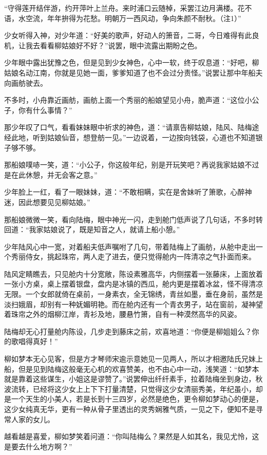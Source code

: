 “守得莲开结伴游，约开萍叶上兰舟。来时浦口云随棹，采罢江边月满楼。花不语，水空流，年年拚得为花愁。明朝万一西风动，争向朱颜不耐秋。（注1）”

少女听得入神，对少年道：“好美的歌声，好动人的箫音，二哥，今日难得有此良机，让我去看看柳姑娘好不好？”说罢，眼中流露出期盼之色。

少年眼中露出犹豫之色，但是见到少女神色，心中一软，终于叹息道：“好吧，柳姑娘名动江南，你就是见她一面，爹爹知道了也不会过分责怪。”说罢让那中年船夫向画舫驶去。

不多时，小舟靠近画舫，画舫上面一个秀丽的船娘望见小舟，脆声道：“这位小公子，你有什么事情？”

那少年叹了口气，看看妹妹眼中祈求的神色，道：“请禀告柳姑娘，陆风、陆梅途经此地，听到姑娘仙音，想登舫一见。”一边说着，一边按向钱袋，心道也不知道银子够不够。

那船娘噗哧一笑，道：“小公子，你这般年纪，别是开玩笑吧？再说我家姑娘不过是在此休憩，并无会客之意。”

少年脸上一红，看了一眼妹妹，道：“不敢相瞒，实在是舍妹听了箫歌，心醉神迷，因此想要见见柳姑娘。”

那船娘微微一笑，看向陆梅，眼中神光一闪，走到舱门低声说了几句话，不多时转回道：“我家姑娘说了，既是知音之人，就请上船小憩。”

少年陆风心中一宽，对着船夫低声嘱咐了几句，带着陆梅上了画舫，从舱中走出一个秀丽侍女，挑起珠帘，两人走了进去，便只觉得舱内一阵清凉之气扑面而来。

陆风定睛瞧去，只见舱内十分宽敞，陈设素雅高华，内侧摆着一张藤床，上面放着一张小方桌，桌上摆着银盘，盘内是冰镇的西瓜，舱内更是摆着冰盆，怪不得清凉无限。一个女郎就倚在桌前，一身素衣，全无锦绣，青丝如墨，垂在身前，虽然是淡扫娥眉，却别有一种妩媚明艳。而在舱内还有一个青衣男子，站在窗前，凝神望着珠帘之外的烟柳江岸，青衫及地，腰悬竹箫，自有一种漠然高华的风姿。

陆梅却无心打量舱内陈设，几步走到藤床之前，欢喜地道：“你便是柳姐姐么？你的歌唱得真好！”

柳如梦本无心见客，但是方才琴师宋逾示意她见一见两人，所以才相邀陆氏兄妹上船，但是见到陆梅这般毫无心机的欢喜赞美，也不由心中一动，浅笑道：“如梦本就是靠着这些谋生，小姐这是谬赞了。”说罢伸出纤纤素手，拉着陆梅坐到身边，秋波流转，已经将这少女上上下下打量清楚，只觉得这少女清丽秀美，年纪虽小，却是一个天生的小美人，若是长到十三四岁，必然是绝色，更令柳如梦动心的便是，这少女纯真无华，更有一种从骨子里透出的灵秀娴雅气质，一见之下，便知不是寻常人家的女儿。

越看越是喜爱，柳如梦笑着问道：“你叫陆梅么？果然是人如其名，我见尤怜，这是要去什么地方啊？”

